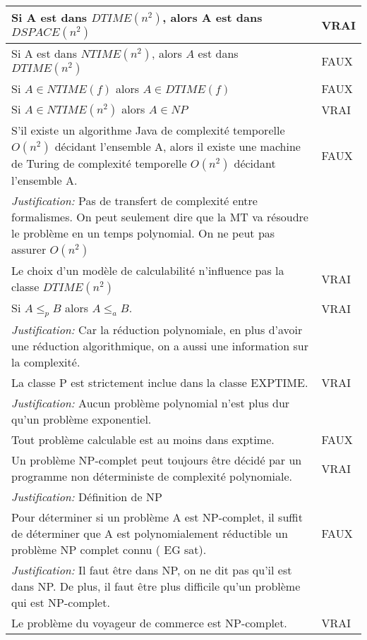 \begin{tabular}{p{13cm}|l}
    Si A est dans $DTIME(n^{2})$, alors A est dans $DSPACE(n^{2})$ & VRAI\\
    \hline
    Si A est dans $NTIME(n^{2})$, alors $A$ est dans $DTIME(n^{2})$& FAUX \\
    \hline
    Si $A \in NTIME(f)$ alors $A\in DTIME(f)$ & FAUX \\
    \hline
    Si $A \in NTIME(n^{2})$ alors $A \in NP$ & VRAI \\
    \hline
    S'il existe un algorithme Java de complexité temporelle $O(n^{2})$ décidant l'ensemble A, alors il existe une machine de Turing de complexité temporelle $O(n^{2})$ décidant l'ensemble A.& FAUX \\
    \textit{Justification:} Pas de transfert de complexité entre formalismes. On peut seulement dire que la MT va résoudre le problème en un temps polynomial. On ne peut pas assurer $O(n^{2})$ & \\
    \hline
    Le choix d'un modèle de calculabilité n'influence pas la classe $DTIME(n^{2})$ & VRAI \\
    \hline
    Si $A \leq_{p} B$ alors $A \leq_{a} B$. & VRAI \\
    \textit{Justification:} Car la réduction polynomiale, en plus d’avoir une réduction algorithmique, on a aussi une information sur la complexité. & \\
    \hline
    La classe P est strictement inclue dans la classe EXPTIME. & VRAI \\
    \textit{Justification:} Aucun problème polynomial n’est plus dur qu’un problème exponentiel. & \\
    \hline
    Tout problème calculable est au moins dans exptime. & FAUX \\
    \hline
    Un problème NP-complet peut toujours être décidé par un programme non déterministe de complexité polynomiale. & VRAI \\
    \textit{Justification:} Définition de NP & \\
    \hline
    Pour déterminer si un problème A est NP-complet, il suffit de déterminer que A est polynomialement réductible un problème NP complet connu ( EG sat).& FAUX \\
    \textit{Justification:} Il faut être dans NP, on ne dit pas qu’il est dans NP. De plus, il faut être plus difficile qu’un problème qui est NP-complet. & \\
    \hline
    Le problème du voyageur de commerce est NP-complet. & VRAI \\
    \hline

\end{tabular}